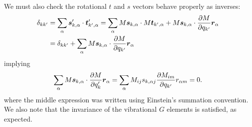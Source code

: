\documentclass{article}
\newcommand{\vect}[1]{\boldsymbol{#1}}
\begin{document}
We must also check the rotational $t$ and $s$ vectors behave properly as inverses:
\[
\begin{split}
\delta_{kk'} &= \sum_{\alpha} \vect{s}'_{k, \alpha}\cdot \vect{t}'_{k', \alpha} = \sum_{\alpha}  M\vect{s}_{k, \alpha}\cdot M\vect{t}_{k', \alpha} +  M\vect{s}_{k, \alpha}\cdot \pdv{M}{q_{k'}}\vect{r}_\alpha \\ &= \delta_{kk'} + \sum_{\alpha}  M\vect{s}_{k, \alpha}\cdot \pdv{M}{q_{k'}}\vect{r}_\alpha \\
\end{split}
\]
implying
\[
\sum_{\alpha}  M\vect{s}_{k, \alpha}\cdot \pdv{M}{q_k'}\vect{r}_\alpha  =\sum_{\alpha} M_{ij} s_{k, \alpha j}\pdv{M_{im}}{q_{k'}}r_{ \alpha m}= 0.
\]
where the middle expression was written using Einstein's summation convention. We also note that the invariance of the vibrational $G$ elements is satisfied, as expected. 
\end{document}
